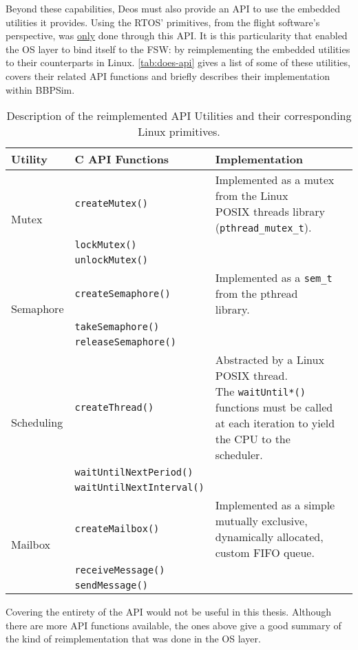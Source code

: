 {Beyond these capabilities, Deos must also provide an API to use the embedded utilities it provides. Using the RTOS' primitives, from the flight software's perspective, was \ul{only} done through this API. It is this particularity that enabled the OS layer to bind itself to the FSW: by reimplementing the embedded utilities to their counterparts in Linux. \autoref{tab:does-api} gives a list of some of these utilities, covers their related API functions and briefly describes their implementation within \gls{BBPSim}. 

\begin{table}[htbp]
	\vspace{12pt}
	\centering
	\begin{tabularx}{\linewidth}{l l X}
		\toprule
		{\bfseries Utility} & \textbf{C API Functions} & \textbf{Implementation}\\
		\midrule
		\multirow{3}{*}{Mutex}  & \texttt{createMutex()}  & \multirowcell{3}[0pt][l]{Implemented as a mutex from the Linux\\ POSIX threads library (\texttt{pthread_mutex_t}).}\\								
		&\texttt{lockMutex()}&\\
		&\texttt{unlockMutex()}&\\
		\midrule
		\multirow{3}{*}{Semaphore}  & \texttt{createSemaphore()}  & \multirowcell{3}[0pt][l]{Implemented as a \texttt{sem_t} from the pthread\\ library.}\\								
		&\texttt{takeSemaphore()}&\\
		&\texttt{releaseSemaphore()}&\\
		\midrule
		\multirow{3}{*}{Scheduling} & \texttt{createThread()}  & \multirowcell{3}[0pt][l]{Abstracted by a Linux POSIX thread.\\ The \texttt{waitUntil*()} functions must be called\\ at each iteration to yield the CPU to the\\ scheduler.}\\
		&\texttt{waitUntilNextPeriod()}&\\
		&\texttt{waitUntilNextInterval()}&\\
		\midrule
		\multirow{3}{*}{Mailbox} & \texttt{createMailbox()}  & \multirowcell{3}[0pt][l]{Implemented as a simple mutually exclusive,\\ dynamically allocated, custom FIFO queue.}\\
		&\texttt{receiveMessage()}&\\
		&\texttt{sendMessage()}&\\
		\bottomrule
	\end{tabularx}
	\caption{Description of the reimplemented API Utilities and their corresponding Linux primitives.}
	\label{tab:does-api}
\end{table}
Covering the entirety of the API would not be useful in this thesis. Although there are more API functions available, the ones above give a good summary of the kind of reimplementation that was done in the OS layer.

}
